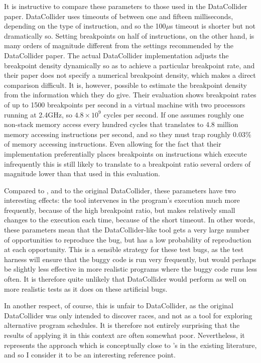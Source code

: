 It is instructive to compare these parameters to those used in the
DataCollider paper.  DataCollider uses timeouts of between one and
fifteen milliseconds, depending on the type of instruction, and so the
100$\mu$s timeout is shorter but not dramatically so.  Setting
breakpoints on half of instructions, on the other hand, is many orders
of magnitude different from the settings recommended by the
DataCollider paper.  The actual DataCollider implementation adjusts
the breakpoint density dynamically so as to achieve a particular
breakpoint rate, and their paper does not specify a numerical
breakpoint density, which makes a direct comparison difficult.  It is,
however, possible to estimate the breakpoint density from the
information which they do give.  Their evaluation shows breakpoint
rates of up to 1500 breakpoints per second in a virtual machine with
two processors running at 2.4GHz, so $4.8 \times 10^9$ cycles per
second.  If one assumes roughly one non-stack memory access every
hundred cycles that translates to 4.8 million memory accessing
instructions per second, and so they must trap roughly 0.03\% of
memory accessing instructions.  Even allowing for the fact that their
implementation preferentially places breakpoints on instructions which
execute infrequently this is still likely to translate to a breakpoint
ratio several orders of magnitude lower than that used in this
evaluation.

Compared to {\technique}, and to the original DataCollider, these
parameters have two interesting effects: the tool intervenes in the
program's execution much more frequently, because of the high
breakpoint ratio, but makes relatively small changes to the execution
each time, because of the short timeout.  In other words, these
parameters mean that the DataCollider-like tool gets a very large
number of opportunities to reproduce the bug, but has a low
probability of reproduction at each opportunity.  This is a sensible
strategy for these test bugs, as the test harness will ensure that the
buggy code is run very frequently, but would perhaps be slightly less
effective in more realistic programs where the buggy code runs less
often.  It is therefore quite unlikely that DataCollider would perform
as well on more realistic tests as it does on these artificial bugs.

In another respect, of course, this is unfair to DataCollider, as the
original DataCollider was only intended to discover races, and not as
a tool for exploring alternative program schedules.  It is therefore
not entirely surprising that the results of applying it in this
context are often somewhat poor.  Nevertheless, it represents the
approach which is conceptually close to {\technique}'s in the existing
literature, and so I consider it to be an interesting reference
point.

